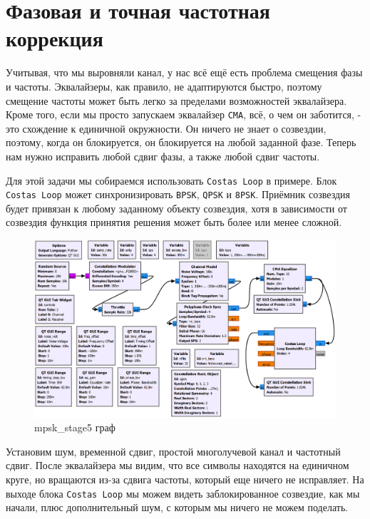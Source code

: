 \documentclass[a4paper,12pt]{report}
\begin{document}
\chapter{Фазовая и точная частотная коррекция}

Учитывая, что мы выровняли канал, у нас всё ещё есть проблема смещения фазы и частоты. Эквалайзеры, как правило, не адаптируются быстро, поэтому смещение частоты может быть легко за пределами возможностей эквалайзера. Кроме того, если мы просто запускаем эквалайзер \texttt{CMA}, всё, о чем он заботится, - это схождение к единичной окружности. Он ничего не знает о созвездии, поэтому, когда он блокируется, он блокируется на любой заданной фазе. Теперь нам нужно исправить любой сдвиг фазы, а также любой сдвиг частоты.

Для этой задачи мы собираемся использовать \texttt{Costas Loop} в примере. Блок \texttt{Costas Loop} может синхронизировать \texttt{BPSK}, \texttt{QPSK} и \texttt{8PSK}. Приёмник созвездия будет привязан к любому заданному объекту созвездия, хотя в зависимости от созвездия функция принятия решения может быть более или менее сложной.

\begin{figure}[H]
        \centering
        \includegraphics[width=1.0\textwidth]{lab12_fig6_1.png}
        \caption{mpsk\_stage5 граф}
        \label{fig:lab12_fig6_1}
\end{figure}

Установим шум, временной сдвиг, простой многолучевой канал и частотный сдвиг. После эквалайзера мы видим, что все символы находятся на единичном круге, но вращаются из-за сдвига частоты, который еще ничего не исправляет. На выходе блока \texttt{Costas Loop} мы можем видеть заблокированное созвездие, как мы начали, плюс дополнительный шум, с которым мы ничего не можем поделать.
\end{document}
